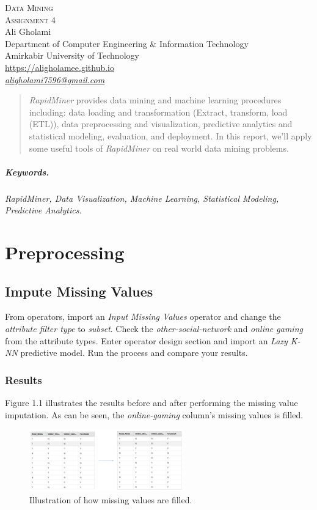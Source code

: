 \documentclass[12pt]{article}
\numberwithin{equation}{section}
\numberwithin{table}{section}
\numberwithin{figure}{section}
\begin{document}

\begin{center}
\textsc{\Huge Data Mining} \\[2pt]
	\textsc{\Large Assignment 4}\\
	\vspace{0.5cm}
  Ali Gholami \\[6pt]
  Department of Computer Engineering \& Information Technology\\
  Amirkabir University of Technology  \\[6pt]
  \def\UrlFont{\em}
  \url{https://aligholamee.github.io}\\
\href{mailto:aligholami7596@gmail.com}{\textit{aligholami7596@gmail.com}}
\end{center}

\begin{abstract}
\textit{RapidMiner} provides data mining and machine learning procedures including: data loading and transformation (Extract, transform, load (ETL)), data preprocessing and visualization, predictive analytics and statistical modeling, evaluation, and deployment. In this report, we'll apply some useful tools of \textit{RapidMiner} on real world data mining problems.
\end{abstract} 

\subparagraph{Keywords.} \textit{RapidMiner, Data Visualization, Machine Learning, Statistical Modeling, Predictive Analytics.}

\section{Preprocessing}
\subsection*{Impute Missing Values}
From operators, import an \textit{Input Missing Values} operator and change the \textit{attribute filter type} to \textit{subset}. Check the \textit{other-social-network} and \textit{online gaming} from the attribute types. Enter operator design section and import an \textit{Lazy K-NN} predictive model. Run the process and compare your results.
\subsubsection*{Results}
Figure 1.1 illustrates the results before and after performing the missing value imputation. As can be seen, the \textit{online-gaming} column's missing values is filled.
\begin{figure}[!h]\centering
	\includegraphics[width=0.6\textwidth]{1_beforeafter.png}
	\caption{Illustration of how missing values are filled.}
	\label{pl1}
\end{figure}
\end{document}
